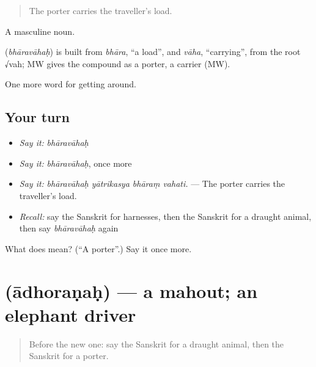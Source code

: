 \begin{quote}
The porter carries the traveller's load.
\end{quote}

A masculine noun.

\begin{cousinweb}
\textbf{} (\emph{bhāravāhaḥ}) is built from \emph{bhāra}, \textquotedblleft{}a load\textquotedblright{}, and \emph{vāha}, \textquotedblleft{}carrying\textquotedblright{}, from the root √vah; MW gives the compound as a porter, a carrier (MW).
\end{cousinweb}

\begin{grammarlens}[title={What you've built}]
One more word for getting around.
\end{grammarlens}

\subsection*{Your turn}
\begin{itemize}
\raggedright
  \item \emph{Say it:} \emph{bhāravāhaḥ}
  \item \emph{Say it:} \emph{bhāravāhaḥ}, once more
  \item \emph{Say it:} \emph{bhāravāhaḥ yātrikasya bhāraṃ vahati.} — The porter carries the traveller's load.
  \item \emph{Recall:} say the Sanskrit for harnesses, then the Sanskrit for a draught animal, then say \emph{bhāravāhaḥ} again
\end{itemize}

\begin{tcolorbox}[breakable,colback=teal!4,colframe=teal!35!black,title={Before you move on}]
What does  mean? (\textquotedblleft{}A porter\textquotedblright{}.) Say it once more.
\end{tcolorbox}
\section[\texorpdfstring{\sk{आधोरणः} (ādhoraṇaḥ)}{आधोरणः (ādhoraṇaḥ)}]{ (ādhoraṇaḥ) — a mahout; an elephant driver}

\label{lesson:SA-C408-adhoranah}



\begin{quote}
Before the new one: say the Sanskrit for a draught animal, then the Sanskrit for a porter.
\end{quote}


